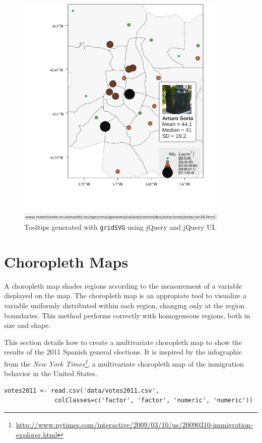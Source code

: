 \documentclass[smallroyalvopaper]{memoir}
\begin{document}
\begin{figure}
\includegraphics[width=0.9\textwidth]{figs/airMadridTooltip.png}
\caption{\label{fig:airMadridTooltip}Tooltips generated with \texttt{gridSVG} using jQuery and jQuery UI.}
\end{figure}

\section{Choropleth Maps}
\label{sec-1}
\label{sec:multiChoropleth}
A choropleth map shades regions according to the measurement of a
variable displayed on the map. The choropleth map is an appropiate
tool to visualize a variable uniformly distributed within each
region, changing only at the region boundaries. This method
performs correctly with homogeneous regions, both in size and
shape.  

This section details how to create a multivariate choropleth map to
show the results of the 2011 Spanish general elections. It is inspired
by the infographic from the \emph{New York Times\footnote{\url{http://www.nytimes.com/interactive/2009/03/10/us/20090310-immigration-explorer.html}}}, a multivariate
choropleth map of the inmigration behavior in the United States.

\lstset{language=R,numbers=none}
\begin{lstlisting}
votes2011 <- read.csv('data/votes2011.csv',
		      colClasses=c('factor', 'factor', 'numeric', 'numeric'))
\end{lstlisting}
\end{document}
